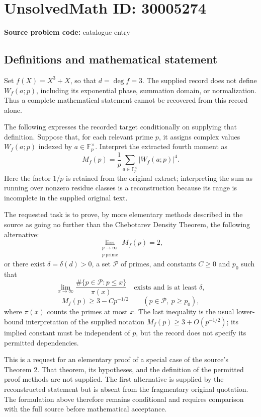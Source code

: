 \documentclass[11pt]{article}
\newcommand{\F}{\mathbb{F}}
\begin{document}
\section*{UnsolvedMath ID: 30005274}
\textbf{Source problem code:} catalogue entry
\subsection{Definitions and mathematical statement}
Set \(f(X)=X^3+X\), so that \(d=\deg f=3\). The supplied record does not define \(W_f(a;p)\), including its exponential phase, summation domain, or normalization. Thus a complete mathematical statement cannot be recovered from this record alone.

The following expresses the recorded target conditionally on supplying that definition. Suppose that, for each relevant prime \(p\), it assigns complex values \(W_f(a;p)\) indexed by \(a\in\F_p^\times\). Interpret the extracted fourth moment as
\[
M_f(p)=\frac1p\sum_{a\in\F_p^\times}|W_f(a;p)|^4.
\]
Here the factor \(1/p\) is retained from the original extract; interpreting the sum as running over nonzero residue classes is a reconstruction because its range is incomplete in the supplied original text.

The requested task is to prove, by more elementary methods described in the source as going no further than the Chebotarev Density Theorem, the following alternative:
\[
\lim_{\substack{p\to\infty\\p\ \mathrm{prime}}}M_f(p)=2,
\]
or there exist \(\delta=\delta(d)>0\), a set \(\mathcal P\) of primes, and constants \(C\geq0\) and \(p_0\) such that
\[
\lim_{x\to\infty}
\frac{\#\{p\in\mathcal P:p\leq x\}}{\pi(x)}
\quad\text{exists and is at least }\delta,
\]
\[
M_f(p)\geq3-Cp^{-1/2}
\qquad(p\in\mathcal P,\ p\geq p_0),
\]
where \(\pi(x)\) counts the primes at most \(x\). The last inequality is the usual lower-bound interpretation of the supplied notation \(M_f(p)\geq3+O(p^{-1/2})\); its implied constant must be independent of \(p\), but the record does not specify its permitted dependencies.

This is a request for an elementary proof of a special case of the source's Theorem 2. That theorem, its hypotheses, and the definition of the permitted proof methods are not supplied. The first alternative is supplied by the reconstructed statement but is absent from the fragmentary original quotation. The formulation above therefore remains conditional and requires comparison with the full source before mathematical acceptance.
\end{document}
